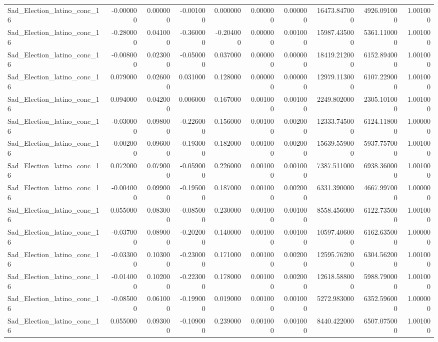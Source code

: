 \begin{table}
\begin{tabular}{lrrrrrrrrr}
Sad_Election_latino_conc_16 & -0.000000 & 0.000000 & -0.001000 & 0.000000 & 0.000000 & 0.000000 & 16473.847000 & 4926.091000 & 1.001000 \\
Sad_Election_latino_conc_16 & -0.280000 & 0.041000 & -0.360000 & -0.204000 & 0.000000 & 0.001000 & 15987.435000 & 5361.110000 & 1.001000 \\
Sad_Election_latino_conc_16 & -0.008000 & 0.023000 & -0.050000 & 0.037000 & 0.000000 & 0.000000 & 18419.212000 & 6152.894000 & 1.001000 \\
Sad_Election_latino_conc_16 & 0.079000 & 0.026000 & 0.031000 & 0.128000 & 0.000000 & 0.000000 & 12979.113000 & 6107.229000 & 1.001000 \\
Sad_Election_latino_conc_16 & 0.094000 & 0.042000 & 0.006000 & 0.167000 & 0.001000 & 0.001000 & 2249.802000 & 2305.101000 & 1.001000 \\
Sad_Election_latino_conc_16 & -0.030000 & 0.098000 & -0.226000 & 0.156000 & 0.001000 & 0.002000 & 12333.745000 & 6124.118000 & 1.000000 \\
Sad_Election_latino_conc_16 & -0.002000 & 0.096000 & -0.193000 & 0.182000 & 0.001000 & 0.002000 & 15639.559000 & 5937.757000 & 1.001000 \\
Sad_Election_latino_conc_16 & 0.072000 & 0.079000 & -0.059000 & 0.226000 & 0.001000 & 0.001000 & 7387.511000 & 6938.360000 & 1.001000 \\
Sad_Election_latino_conc_16 & -0.004000 & 0.099000 & -0.195000 & 0.187000 & 0.001000 & 0.002000 & 6331.390000 & 4667.997000 & 1.000000 \\
Sad_Election_latino_conc_16 & 0.055000 & 0.083000 & -0.085000 & 0.230000 & 0.001000 & 0.001000 & 8558.456000 & 6122.735000 & 1.001000 \\
Sad_Election_latino_conc_16 & -0.037000 & 0.089000 & -0.202000 & 0.140000 & 0.001000 & 0.001000 & 10597.406000 & 6162.635000 & 1.000000 \\
Sad_Election_latino_conc_16 & -0.033000 & 0.103000 & -0.230000 & 0.171000 & 0.001000 & 0.002000 & 12595.762000 & 6304.562000 & 1.001000 \\
Sad_Election_latino_conc_16 & -0.014000 & 0.102000 & -0.223000 & 0.178000 & 0.001000 & 0.002000 & 12618.588000 & 5988.790000 & 1.001000 \\
Sad_Election_latino_conc_16 & -0.085000 & 0.061000 & -0.199000 & 0.019000 & 0.001000 & 0.001000 & 5272.983000 & 6352.596000 & 1.000000 \\
Sad_Election_latino_conc_16 & 0.055000 & 0.093000 & -0.109000 & 0.239000 & 0.001000 & 0.001000 & 8440.422000 & 6507.075000 & 1.001000 \\

\end{tabular}
\end{table}
